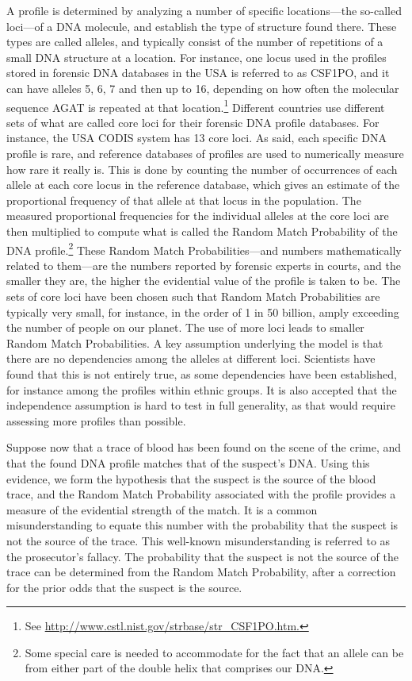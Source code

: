 \documentclass[10pt]{article}
\begin{document}
A profile is determined by analyzing a number of specific locations---the so-called loci---of a DNA molecule, and establish the type of structure found there. These types are called alleles, and typically consist of the number of repetitions of a small DNA structure at a location. For instance, one locus used in the profiles stored in forensic DNA databases in the USA is referred to as CSF1PO, and it can have alleles 5, 6, 7 and then up to 16, depending on how often the molecular sequence AGAT is repeated at that location.\footnote{See \url{http://www.cstl.nist.gov/strbase/str\_CSF1PO.htm.}} Different countries use different sets of what are called core loci for their forensic DNA profile databases. For instance, the USA CODIS system has 13 core loci. As said, each specific DNA profile is rare, and reference databases of profiles are used to numerically measure how rare it really is. This is done by counting the number of occurrences of each allele at each core locus in the reference database, which gives an estimate of the proportional frequency of that allele at that locus in the population. The measured proportional frequencies for the individual alleles at the core loci are then multiplied to compute what is called the Random Match Probability of the DNA profile.\footnote{Some special care is needed to accommodate for the fact that an allele can be from either part of the double helix that comprises our DNA.} These Random Match Probabilities---and numbers mathematically related to them---are the numbers reported by forensic experts in courts, and the smaller they are, the higher the evidential value of the profile is taken to be. The sets of core loci have been chosen such that Random Match Probabilities are typically very small, for instance, in the order of 1 in 50 billion, amply exceeding the number of people on our planet. The use of more loci leads to smaller Random Match Probabilities. A key assumption underlying the model is that there are no dependencies among the alleles at different loci. Scientists have found that this is not entirely true, as some dependencies have been established, for instance among the profiles within ethnic groups. It is also accepted that the independence assumption is hard to test in full generality, as that would require assessing more profiles than possible.

Suppose now that a trace of blood has been found on the scene of the crime, and that the found DNA profile matches that of the suspect's DNA. Using this evidence, we form the hypothesis that the suspect is the source of the blood trace, and the Random Match Probability associated with the profile provides a measure of the evidential strength of the match. It is a common misunderstanding to equate this number with the probability that the suspect is not the source of the trace. This well-known misunderstanding is referred to as the prosecutor's fallacy. The probability that the suspect is not the source of the trace can be determined from the Random Match Probability, after a correction for the prior odds that the suspect is the source.
\end{document}
